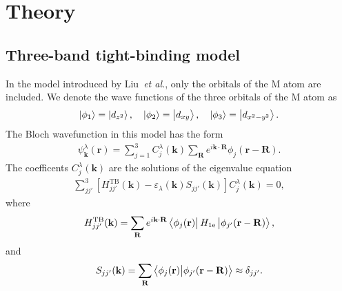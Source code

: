 \documentclass{article}
\newcommand{\thesistitlee}{title}
\newcommand{\graddate}{Ho Chi Minh City, 2025}
\begin{document}
%			
%			
%
{}
\pagestyle{fancy}
\renewcommand{\headrulewidth}{0pt}
\fancyhf{}
\fancyfoot[C]{\hspace{0cm} \thepage}
\setcounter{page}{1}
\section{Theory}
\subsection{Three-band tight-binding model}
\noindent In the model introduced by Liu~\textit{et al.}, only the orbitals of the M atom are included. We denote the wave functions of the three orbitals of the M atom as
\begin{gather}
	\ket{\phi_{1}} = \ket{d_{z^{2}}} , \quad \ket{\phi_{2}} = \ket{d_{xy}} , \quad \ket{\phi_{3}} = \ket{d_{x^{2} - y^{2}}}.
\end{gather}
The Bloch wavefunction in this model has the form
\begin{gather}
	\psi_{\mathbf{k}}^{\lambda} (\mathbf{r}) = \sum_{j=1}^{3} C_{j}^{\lambda}(\mathbf{k}) \sum_{\mathbf{R}} e^{i \mathbf{k \cdot R}} \phi_{j}(\mathbf{r} - \mathbf{R}).
\end{gather}
The coefficents $C_{j}^{\lambda}(\mathbf{k})$ are the solutions of the eigenvalue equation
\begin{gather}
	\sum_{jj'}^{3} \left[H_{jj'}^{\text{TB}}(\mathbf{k}) - \varepsilon_{\lambda}(\mathbf{k}) S_{jj'}(\mathbf{k})\right] C_{j}^{\lambda}(\mathbf{k}) = 0,
\end{gather}
where
\begin{equation}
	\begin{aligned}
		H_{jj'}^{\text{TB}}(\mathbf{k}) = \sum_{\mathbf{R}} e^{i \mathbf{k \cdot R}} \bra{\phi_{j}(\mathbf{r})} H_{\text{1e}} \ket{\phi_{j'}(\mathbf{r - R})},
	\end{aligned}
\end{equation}
and
\begin{equation}
	\begin{aligned}
		S_{jj'}(\mathbf{k}) = \sum_{\mathbf{R}} \bra{\phi_{j}(\mathbf{r})} \ket{\phi_{j'}(\mathbf{r - R})} \approx \delta_{jj'}.
	\end{aligned}
\end{equation}
\end{document}
